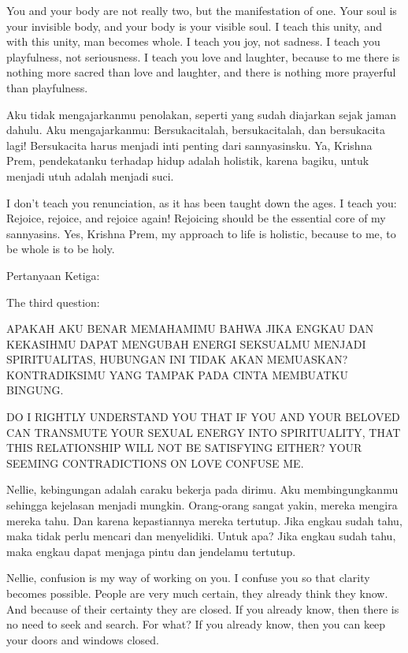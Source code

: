 \english
You and your body are not really two, but the manifestation of one. Your soul is your invisible body, and your body is your visible soul. I teach this unity, and with this unity, man becomes whole. I teach you joy, not sadness. I teach you playfulness, not seriousness. I teach you love and laughter, because to me there is nothing more sacred than love and laughter, and there is nothing more prayerful than playfulness.

\bahasa
Aku tidak mengajarkanmu penolakan, seperti yang sudah diajarkan sejak jaman dahulu. Aku mengajarkanmu: Bersukacitalah, bersukacitalah, dan bersukacita lagi! Bersukacita harus menjadi inti penting dari sannyasinsku. Ya, Krishna Prem, pendekatanku terhadap hidup adalah holistik, karena bagiku, untuk menjadi utuh adalah menjadi suci.

\english
I don't teach you renunciation, as it has been taught down the ages. I teach you: Rejoice, rejoice, and rejoice again! Rejoicing should be the essential core of my sannyasins. Yes, Krishna Prem, my approach to life is holistic, because to me, to be whole is to be holy.

\bahasa
Pertanyaan Ketiga:

\english
The third question:

\bahasa
APAKAH AKU BENAR MEMAHAMIMU BAHWA JIKA ENGKAU DAN KEKASIHMU DAPAT MENGUBAH ENERGI SEKSUALMU MENJADI SPIRITUALITAS, HUBUNGAN INI TIDAK AKAN MEMUASKAN? KONTRADIKSIMU YANG TAMPAK PADA CINTA MEMBUATKU BINGUNG.

\english
DO I RIGHTLY UNDERSTAND YOU THAT IF YOU AND YOUR BELOVED CAN TRANSMUTE YOUR SEXUAL ENERGY INTO SPIRITUALITY, THAT THIS RELATIONSHIP WILL NOT BE SATISFYING EITHER? YOUR SEEMING CONTRADICTIONS ON LOVE CONFUSE ME.

\bahasa
Nellie, kebingungan adalah caraku bekerja pada dirimu. Aku membingungkanmu sehingga kejelasan menjadi mungkin. Orang-orang sangat yakin, mereka mengira mereka tahu. Dan karena kepastiannya mereka tertutup. Jika engkau sudah tahu, maka tidak perlu mencari dan menyelidiki. Untuk apa? Jika engkau sudah tahu, maka engkau dapat menjaga pintu dan jendelamu tertutup.

\english
Nellie, confusion is my way of working on you. I confuse you so that clarity becomes possible. People are very much certain, they already think they know. And because of their certainty they are closed. If you already know, then there is no need to seek and search. For what? If you already know, then you can keep your doors and windows closed.

